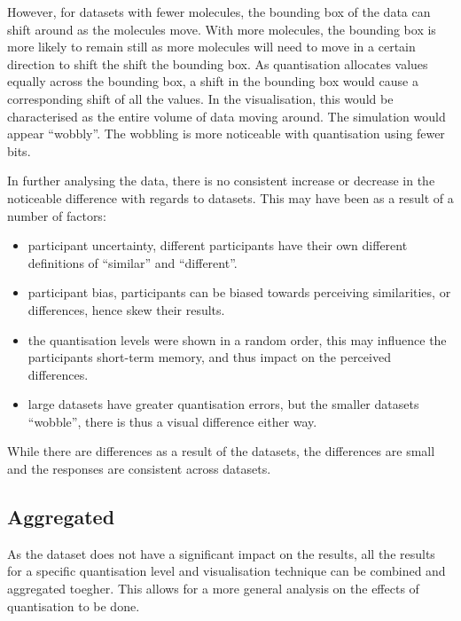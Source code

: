 However, for datasets with fewer molecules, the bounding box of the data can
shift around as the molecules move.  With more molecules, the bounding box is
more likely to remain still as more molecules will need to move in a certain
direction to shift the shift the bounding box.  As quantisation allocates
values equally across the bounding box, a shift in the bounding box would cause
a corresponding shift of all the values. In the visualisation, this would be
characterised as the entire volume of data moving around. The simulation would
appear ``wobbly''. The wobbling is more noticeable with quantisation using
fewer bits.

In further analysing the data, there is no consistent increase or decrease in
the noticeable difference with regards to datasets.  This may have been as a
result of a number of factors:
\begin{itemize}

  \item participant uncertainty, different participants have their own
  different definitions of ``similar'' and ``different''.

  \item participant bias, participants can be biased towards perceiving
  similarities, or differences, hence skew their results.

  \item the quantisation levels were shown in a random order, this may
  influence the participants short-term memory, and thus impact on the
  perceived differences.

  \item large datasets have greater quantisation errors, but the smaller
  datasets ``wobble'', there is thus a visual difference either way.

\end{itemize}

While there are differences as a result of the datasets, the differences are
small and the responses are consistent across datasets.


\subsection{Aggregated}
\label{sub:results_discussion_aggregated}

As the dataset does not have a significant impact on the results, all the
results for a specific quantisation level and visualisation technique can be
combined and aggregated toegher. This allows for a more general analysis on the
effects of quantisation to be done.

